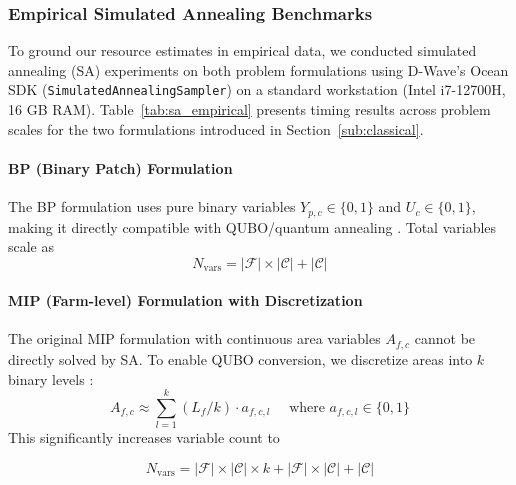 \documentclass{oqireport}
\begin{document}

\subsubsection{Empirical Simulated Annealing Benchmarks}

To ground our resource estimates in empirical data, we conducted simulated annealing (SA) experiments on both problem formulations using D-Wave's Ocean SDK (\texttt{SimulatedAnnealingSampler}) \cite{dwave_ocean} on a standard workstation (Intel i7-12700H, 16 GB RAM). Table~\ref{tab:sa_empirical} presents timing results across problem scales for the two formulations introduced in Section~\ref{sub:classical}.

\paragraph{BP (Binary Patch) Formulation}

The BP formulation uses pure binary variables $Y_{p,c} \in \{0,1\}$ and $U_c \in \{0,1\}$, making it directly compatible with QUBO/quantum annealing \cite{lucas2014ising, glover2018tutorial}. Total variables scale as 
\begin{equation}
N_{\text{vars}} = |\mathcal{F}| \times |\mathcal{C}| + |\mathcal{C}|
\end{equation}


\paragraph{MIP (Farm-level) Formulation with Discretization}

The original MIP formulation with continuous area variables $A_{f,c}$ cannot be directly solved by SA. To enable QUBO conversion, we discretize areas into $k$ binary levels \cite{chancellor2019domain}: $$A_{f,c} \approx \sum_{l=1}^{k} (L_f/k) \cdot a_{f,c,l} \quad\text{ where }a_{f,c,l} \in \{0,1\}$$ This significantly increases variable count to 

\begin{equation}
N_{\text{vars}} = |\mathcal{F}| \times |\mathcal{C}|\times k + |\mathcal{F}| \times |\mathcal{C}| + |\mathcal{C}|
\end{equation}
\end{document}

